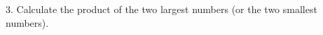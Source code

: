 \documentclass[preview]{standalone}
\begin{document}
3. Calculate the product of the two largest numbers (or the two smallest numbers).\\
\end{document}
